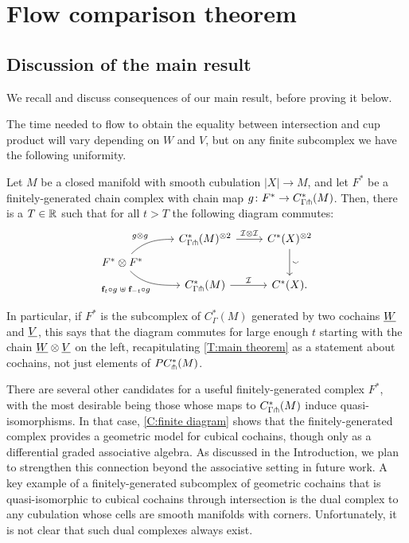 
\section{Flow comparison theorem}\label{S:flow comparison theorem}

\subsection{Discussion of the main result}

We recall and discuss consequences of our main result, before proving it below.
\maintheorem*

The time needed to flow to obtain the equality between intersection and cup product will vary depending on $W$ and $V$, but on any finite subcomplex we have the following uniformity.

\begin{corollary}\label{C:finite diagram}
	Let $M$ be a closed manifold with smooth cubulation $|X| \to M$, and let $F^*$ be a finitely-generated chain complex with chain map $g \colon F^*\to C^*_{\Gamma \pitchfork}(M)$.
	Then, there is a $T \in \mathbb{R}$ such that for all $t > T$ the following diagram commutes:
	\begin{equation*}
		\begin{tikzcd} [row sep=tiny]
			& C^*_{\Gamma \pf}(M)^{\otimes 2} \arrow[r, "\cI \otimes \cI"] & \cochains(X)^{\otimes 2} \arrow[dd, "\sms"] \\
			F^*\otimes F^* \arrow[ur, in=180, out=45,"g\otimes g"] \arrow[dr, in=180, out=-45, "\f_t \circ g \; \uplus \; \f_{-t} \circ g"']& & \\
			& C^*_{\Gamma \pf}(M) \arrow[r, "\cI"] & \cochains(X).
		\end{tikzcd}
	\end{equation*}
\end{corollary}

In particular, if $F^*$ is the subcomplex of $C^*_\Gamma(M)$ generated by two cochains $\underline{W}$ and $\underline{V}$, this says that the diagram commutes for large enough $t$ starting with the chain $\underline{W}\otimes\underline{V}$ on the left, recapitulating \cref{T:main theorem} as a statement about cochains, not just elements of $PC_\pitchfork^*(M)$.

There are several other candidates for a useful finitely-generated complex $F^*$, with the most desirable being those whose maps to $C^*_{\Gamma \pitchfork}(M)$ induce quasi-isomorphisms.
In that case, \cref{C:finite diagram} shows that the finitely-generated complex provides a geometric model for cubical cochains, though only as a differential graded associative algebra.
As discussed in the Introduction, we plan to strengthen this connection beyond the associative setting in future work.
A key example of a finitely-generated subcomplex of geometric cochains that is quasi-isomorphic to cubical cochains through intersection
is the dual complex to any cubulation whose cells are smooth manifolds with corners.
Unfortunately, it is not clear that such dual complexes always exist.

